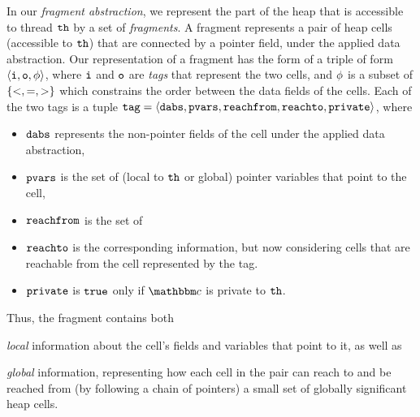 In our {\em fragment abstraction}, we represent the part of the heap
that is accessible to thread ${\tt th}$ by a set of {\em fragments}. 
A fragment represents a pair of heap cells (accessible to ${\tt th}$)
that are connected by a pointer field, under the applied data abstraction.
Our representation of a fragment has the form of a  triple of form
$\left\langle\mathtt{i},\mathtt{o},\phi\right\rangle$,
where $\mathtt{i}$ and $\mathtt{o}$ are {\em tags} that represent the two cells, and $\phi$
is a subset of $\left\{<, =, >\right\}$ which constrains the order between the data fields
of the cells. Each of the two tags is a tuple $\mathtt{tag} = \left\langle\mathtt{dabs},\mathtt{pvars},\mathtt{reachfrom},\mathtt{reachto},\mathtt{private}\right\rangle$, where
\begin{itemize}
\item
  $\mathtt{dabs}$ represents the non-pointer fields of the cell under the applied
  data abstraction,
\item
  $\mathtt{pvars}$ is the set of (local to ${\tt th}$ or global) pointer variables that
  point to the cell,
 \item
  $\mathtt{reachfrom}$ is the set of
\item
  $\mathtt{reachto}$ is the corresponding information, but now considering cells that
  are reachable from the cell represented by the tag.
  \item $\mathtt{private}$ is ${\tt true}$ only if $\cell$ is private to ${\tt th}$.
\end{itemize}
Thus, the fragment contains both
\begin{inparaenum}[(i)]
\item {\em local} information about the cell's fields and variables that
  point to it, as well as
\item {\em global} information, representing how
  each cell in the pair can reach to and be reached from
  (by following a chain of pointers) a small set of globally significant
  heap cells.
\end{inparaenum}

